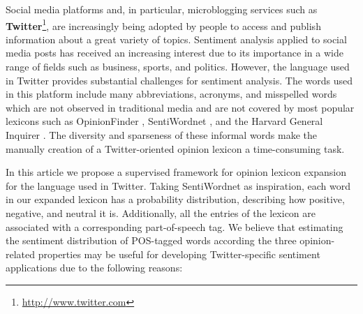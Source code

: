 \documentclass{sig-alternate}
\begin{document}
Social media platforms and, in particular, microblogging services such as \textbf{Twitter}\footnote{\url{http://www.twitter.com}}, are increasingly being adopted by people to access and publish information about a great variety of topics. Sentiment analysis applied to social media posts has received an increasing interest due to its importance in a wide range of fields such as business, sports, and politics. However, the language used in Twitter provides substantial challenges for sentiment analysis. The words used in this platform include many abbreviations, acronyms, and misspelled words which are not observed in traditional media and are not covered by most popular lexicons such as OpinionFinder \cite{Wilson2005}, SentiWordnet \cite{esuli2006}, and the Harvard General Inquirer \cite{stone66}. The diversity and sparseness of these informal words make the manually creation of a Twitter-oriented opinion lexicon a time-consuming task.


In this article we propose a supervised framework for opinion lexicon expansion for the language used in Twitter.  Taking SentiWordnet as inspiration, each word in our expanded lexicon has a probability distribution, describing how positive, negative, and neutral it is.  Additionally, all the entries of the lexicon are associated with a corresponding part-of-speech tag. We believe that estimating the sentiment distribution of POS-tagged words according the three opinion-related properties may be useful for developing Twitter-specific sentiment applications due to the following reasons:
\end{document}
